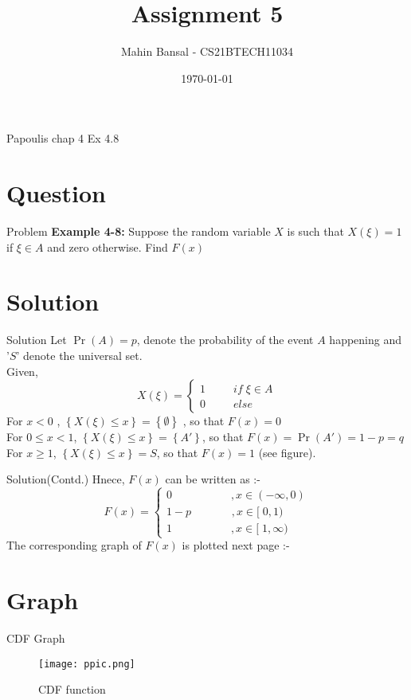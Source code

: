 \documentclass{beamer}
\title{Assignment 5}
\author{Mahin Bansal - CS21BTECH11034}
\date{\today}
\providecommand{\pr}[1]{\ensuremath{\Pr\left(#1\right)}}
\providecommand{\brak}[1]{\ensuremath{\left(#1\right)}}
\providecommand{\cbrak}[1]{\ensuremath{\left\{#1\right\}}}
\begin{document}
\begin{frame}
    \titlepage 
\end{frame}

\logo{}


\begin{frame}{Papoulis chap 4 Ex 4.8}

    \tableofcontents
\end{frame}


\section{Question}
\begin{frame}{Problem}
\textbf{Example 4-8:  }Suppose the random variable $X$ is such that   $X\brak{\xi} = 1$ if $\xi \in A$ and zero otherwise. Find $F(x)$
\end{frame}

\section{Solution}
\begin{frame}{Solution}
  Let $\pr{A} = p$, denote the probability of the event $A$ happening and '$S$' denote the universal set.\\
   Given, \[
        X\brak{\xi}=\left\{
                \begin{array}{ll}
                  1 \;\;\;\;\;\;\;\;\;    if \;\xi \in A \\
                  0  \;\;\;\;\;\;\;\;\;    else
                \end{array}
              \right.
  \]
  For $ x<0 $ , $\cbrak{X\brak{\xi} \le x} = \cbrak{\emptyset}$ , so that $F(x)=0$ \\
  For $ 0 \le x < 1 $, $\cbrak{X\brak{\xi} \le x} = \cbrak{A'}$, so 
that $F(x) = \pr{A'} = 1 - p = q $
For $ x \ge 1 $, $\cbrak{X\brak{\xi} \le x} = S$, so that $F(x) = 1$ (see figure).
\end{frame}

\begin{frame}{Solution(Contd.)}
Hnece, $F(x)$ can be written as :-
        \[
        F(x)=\left\{
                \begin{array}{ll}
                  0  \;\;\;\;\;\;\;\;\;\;\;\;\;\;\;\; \;\; \; , x \in \brak{-\infty,0}  \\
                  1-p  \;\;\;\;\;\;\;\;\;\;\;  \; \;, x \in [\; 0,1)  \\
                  1  \;\;\;\;\;\;\;\;\;\;\;\;\;\;\;\; \;\;\;  , x \in [\;1,\infty)
                  \end{array}
              \right.
       \]
       The corresponding graph of $F(x)$ is plotted next page :-
\end{frame}

\section{Graph}
\begin{frame}{CDF Graph}
    \begin{figure}[!ht]
		\centering
		\texttt{[image: ppic.png]}
		\caption{CDF function}
		\label{fig1}
	\end{figure}
\end{frame}
 
\end{document}
